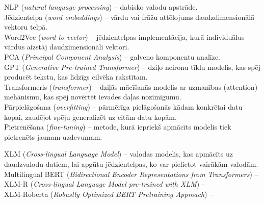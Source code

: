 NLP (\textit{natural language processing}) -- dabisko valodu apstrāde.\\
Jēdzientelpa (\textit{word embeddings}) -- vārdu vai frāžu attēlojums daudzdimensionālā vektoru telpā.\\
Word2Vec (\textit{word to vector}) -- jēdzientelpas implementācija, kurā individuālus vārdus aizstāj daudzimensionāli vektori.\\
PCA (\textit{Principal Component Analysis}) -- galveno komponentu analīze.\\
GPT (\textit{Generative Pre-trained Transformer}) – dziļo neironu tīklu modelis, kas spēj producēt tekstu, kas līdzīgs cilvēka rakstītam.\\
Transformeris (\textit{transformer}) -- dziļās mācīšanās modelis ar uzmanības (attention) mehānismu, kas spēj novērtēt ievades daļas nozīmīgumu.\\
Pārpielāgošana (\textit{overfitting}) -- pārmērīga pielāgošanās kādam konkrētai datu kopai, zaudējot spēju ģeneralizēt uz citām datu kopām.\\
Pietrenēšana (\textit{fine-tuning}) -- metode, kurā iepriekš apmācīts modelis tiek pietrenēts jaunam uzdevumam.

XLM (\textit{Cross-lingual Language Model}) -- valodas modelis, kas apmācīts uz daudzvalodu datiem, lai apgūtu jēdzientelpas, ko var pielietot vairākām valodām.\\
Multilingual BERT (\textit{Bidirectional Encoder Representations from Transformers}) --\\
XLM-R (\textit{Cross-lingual Language Model pre-trained with XLM}) --\\
XLM-Roberta (\textit{Robustly Optimized BERT Pretraining Approach}) -- \\
